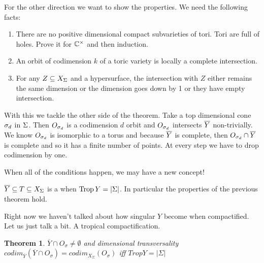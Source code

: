 \documentclass[12pt]{memoir}
\DeclareMathOperator{\Trop}{Trop}
\newtheorem{prototheorem}{Theorem}[section]
\newenvironment{theorem}
   {\begin{prototheorem}}
   {\end{prototheorem}}
\theoremstyle{definition}
\begin{document}
\begin{ptcbp}
For the other direction we want to show the properties. We need the following facts:
\begin{enumerate}
    \item There are no positive dimensional compact subvarieties of tori. Tori are full of holes. Prove it for $\mathbb{C}^\times$ and then induction.
    \item An orbit of codimension $k$ of a toric variety is locally a complete intersection.
    \item For any $Z\subseteq X_\Sigma$ and a hypersurface, the intersection with $Z$ either remains the same dimension or the dimension goes down by 1 or they have empty intersection.
\end{enumerate}
With this we tackle the other side of the theorem. Take a top dimensional cone $\sigma_d$ in $\Sigma$. Then $O_{\sigma_d}$ is a codimension $d$ orbit and $O_{\sigma_d}$ intersects $\overline Y$ non-trivially. We know $O_{\sigma_d}$ is isomorphic to a torus and because $\overline Y$ is complete, then $ O_{\sigma_d}\cap\overline Y$ is complete and so it has a finite number of points.  At every step we have to drop codimension by one.
\end{ptcbp}

When all of the conditions happen, we may have a new concept!

\begin{Def}
    $\overline Y\subseteq T\subseteq X_\Sigma$ is a  when $\Trop Y=|\Sg|$. In particular the properties of the previous theorem hold.
\end{Def}

Right now we haven't talked about how singular $Y$ become when compactified. Let us just talk a bit. A tropical compactification.



\begin{theorem}
    $\overline{Y} \cap O_\sigma \neq \emptyset$ and dimensional transversality $codim_{\overline{Y}}(\overline{Y} \cap O_\sigma) = codim_{X_\Sigma}(O_\sigma)$ iff $Trop Y= |\Sigma|$
\end{theorem}
\end{document}
